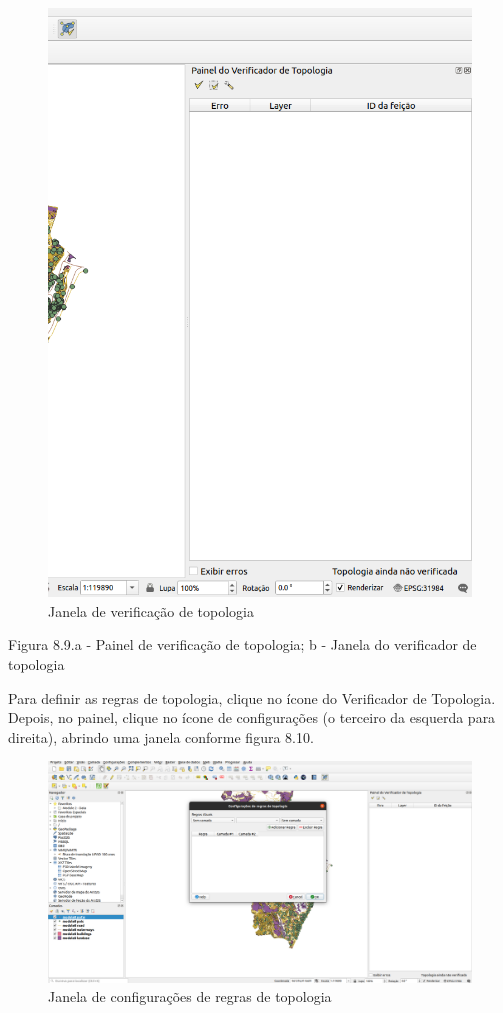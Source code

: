 \documentclass[
]{book}
\begin{document}
\begin{figure}
\centering
\includegraphics{media/modulo8/fig89_b.png}
\caption{Janela de verificação de topologia}
\end{figure}

Figura 8.9.a - Painel de verificação de topologia; b - Janela do verificador de topologia

Para definir as regras de topologia, clique no ícone do Verificador de Topologia. Depois, no painel, clique no ícone de configurações (o terceiro da esquerda para direita), abrindo uma janela conforme figura 8.10.

\begin{figure}
\centering
\includegraphics{media/modulo8/fig810.png}
\caption{Janela de configurações de regras de topologia}
\end{figure}
\end{document}
